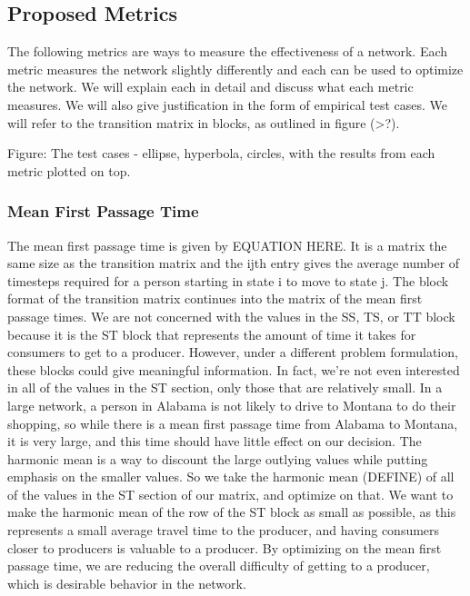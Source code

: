 \documentclass[twoside,twocolumn]{article}
\begin{document}
\subsection{Proposed Metrics}
The following metrics are ways to measure the effectiveness of a network.
Each metric measures the network slightly differently and each can be used to optimize the network.
We will explain each in detail and discuss what each metric measures.
We will also give justification in the form of empirical test cases.
We will refer to the transition matrix in blocks, as outlined in figure (>?).


Figure: The test cases - ellipse, hyperbola, circles, with the results from each metric plotted on top.


\subsubsection{Mean First Passage Time}
The mean first passage time is given by EQUATION HERE.
It is a matrix the same size as the transition matrix and the ijth entry gives the average number of timesteps required for a person starting in state i to move to state j.
The block format of the transition matrix continues into the matrix of the mean first passage times.
We are not concerned with the values in the SS, TS, or TT block because it is the ST block that represents the amount of time it takes for consumers to get to a producer.
However, under a different problem formulation, these blocks could give meaningful information.
In fact, we're not even interested in all of the values in the ST section, only those that are relatively small.
In a large network, a person in Alabama is not likely to drive to Montana to do their shopping, so while there is a mean first passage time from Alabama to Montana, it is very large, and this time should have little effect on our decision.
The harmonic mean is a way to discount the large outlying values while putting emphasis on the smaller values.
So we take the harmonic mean (DEFINE) of all of the values in the ST section of our matrix, and optimize on that.
We want to make the harmonic mean of the row of the ST block as small as possible, as this represents a small average travel time to the producer, and having consumers closer to producers is valuable to a producer.
By optimizing on the mean first passage time, we are reducing the overall difficulty of getting to a producer, which is desirable behavior in the network.
\end{document}
